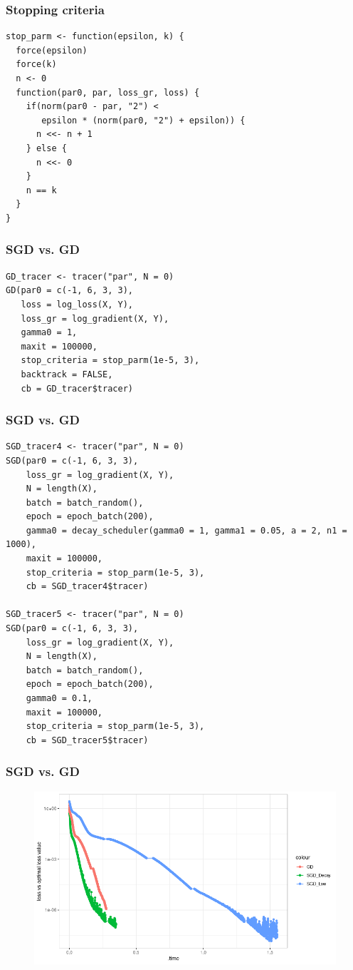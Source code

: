 \documentclass[aspectratio=169]{beamer}
\begin{document}
\begin{frame}[fragile]
    \frametitle{Stopping criteria}
\begin{verbatim}
stop_parm <- function(epsilon, k) {
  force(epsilon)
  force(k)
  n <- 0
  function(par0, par, loss_gr, loss) {
    if(norm(par0 - par, "2") < 
       epsilon * (norm(par0, "2") + epsilon)) {
      n <<- n + 1
    } else {
      n <<- 0
    }
    n == k
  }
}
\end{verbatim}
\end{frame}
\begin{frame}[fragile]
    \frametitle{SGD vs. GD}  
\begin{verbatim}
GD_tracer <- tracer("par", N = 0)
GD(par0 = c(-1, 6, 3, 3),
   loss = log_loss(X, Y),
   loss_gr = log_gradient(X, Y),
   gamma0 = 1,
   maxit = 100000,
   stop_criteria = stop_parm(1e-5, 3),
   backtrack = FALSE,
   cb = GD_tracer$tracer)
\end{verbatim}
\end{frame}
\begin{frame}[fragile]
    \frametitle{SGD vs. GD}
\begin{verbatim}
SGD_tracer4 <- tracer("par", N = 0)
SGD(par0 = c(-1, 6, 3, 3),
    loss_gr = log_gradient(X, Y),
    N = length(X),
    batch = batch_random(),
    epoch = epoch_batch(200),
    gamma0 = decay_scheduler(gamma0 = 1, gamma1 = 0.05, a = 2, n1 = 1000),
    maxit = 100000,
    stop_criteria = stop_parm(1e-5, 3),
    cb = SGD_tracer4$tracer)

SGD_tracer5 <- tracer("par", N = 0)
SGD(par0 = c(-1, 6, 3, 3),
    loss_gr = log_gradient(X, Y),
    N = length(X),
    batch = batch_random(),
    epoch = epoch_batch(200),
    gamma0 = 0.1,
    maxit = 100000,
    stop_criteria = stop_parm(1e-5, 3),
    cb = SGD_tracer5$tracer)
\end{verbatim}
\end{frame}
\begin{frame}
    \frametitle{SGD vs. GD}
    \begin{figure}
        \centering
        \includegraphics[scale = 0.4]{figure/GD_Comparison.png}
    \end{figure}
\end{frame}
\end{document}

